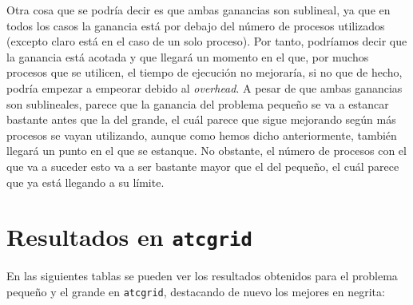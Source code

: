 \documentclass[11pt,a4paper]{article}
\begin{document}
Otra cosa que se podría decir es que ambas ganancias son sublineal, ya que en todos los casos
la ganancia está por debajo del número de procesos utilizados (excepto claro está en el
caso de un solo proceso). Por tanto, podríamos decir que la ganancia está acotada y que
llegará un momento en el que, por muchos procesos que se utilicen, el tiempo de ejecución
no mejoraría, si no que de hecho, podría empezar a empeorar debido al \textit{overhead}.
A pesar de que ambas ganancias son sublineales, parece que la ganancia del problema
pequeño se va a estancar bastante antes que la del grande, el cuál parece que sigue mejorando
según más procesos se vayan utilizando, aunque como hemos dicho anteriormente, también
llegará un punto en el que se estanque. No obstante, el número de procesos con el que
va a suceder esto va a ser bastante mayor que el del pequeño, el cuál parece que ya
está llegando a su límite.

\section{Resultados en \texttt{atcgrid}}

En las siguientes tablas se pueden ver los resultados obtenidos para el problema pequeño
y el grande en \texttt{atcgrid}, destacando de nuevo los mejores en negrita:
\end{document}
